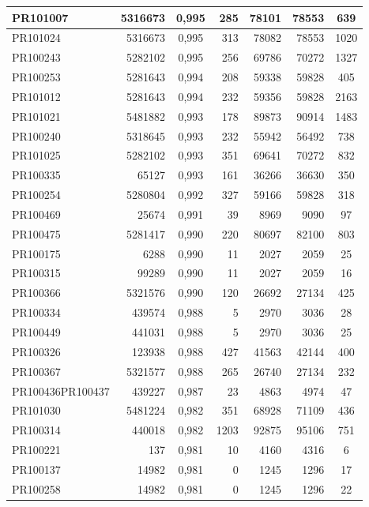 \begin{center}
\begin{longtable}{lr|c|rrr|c}
	PR101007 & 5316673 & 0,995 & 285 & 78101 & 78553 & 639 \\ \hline
	PR101024 & 5316673 & 0,995 & 313 & 78082 & 78553 & 1020 \\ \hline
	PR100243 & 5282102 & 0,995 & 256 & 69786 & 70272 & 1327 \\ \hline
	PR100253 & 5281643 & 0,994 & 208 & 59338 & 59828 & 405 \\ \hline
	PR101012 & 5281643 & 0,994 & 232 & 59356 & 59828 & 2163 \\ \hline
	PR101021 & 5481882 & 0,993 & 178 & 89873 & 90914 & 1483 \\ \hline
	PR100240 & 5318645 & 0,993 & 232 & 55942 & 56492 & 738 \\ \hline
	PR101025 & 5282102 & 0,993 & 351 & 69641 & 70272 & 832 \\ \hline
	PR100335 & 65127 & 0,993 & 161 & 36266 & 36630 & 350 \\ \hline
	PR100254 & 5280804 & 0,992 & 327 & 59166 & 59828 & 318 \\ \hline
	PR100469 & 25674 & 0,991 & 39 & 8969 & 9090 & 97 \\ \hline
	PR100475 & 5281417 & 0,990 & 220 & 80697 & 82100 & 803 \\ \hline
	PR100175 & 6288 & 0,990 & 11 & 2027 & 2059 & 25 \\ \hline
	PR100315 & 99289 & 0,990 & 11 & 2027 & 2059 & 16 \\ \hline
	PR100366 & 5321576 & 0,990 & 120 & 26692 & 27134 & 425 \\ \hline
	PR100334 & 439574 & 0,988 & 5 & 2970 & 3036 & 28 \\ \hline
	PR100449 & 441031 & 0,988 & 5 & 2970 & 3036 & 25 \\ \hline
	PR100326 & 123938 & 0,988 & 427 & 41563 & 42144 & 400 \\ \hline
	PR100367 & 5321577 & 0,988 & 265 & 26740 & 27134 & 232 \\ \hline
	PR100436PR100437 & 439227 & 0,987 & 23 & 4863 & 4974 & 47 \\ \hline
	PR101030 & 5481224 & 0,982 & 351 & 68928 & 71109 & 436 \\ \hline
	PR100314 & 440018 & 0,982 & 1203 & 92875 & 95106 & 751 \\ \hline
	PR100221 & 137 & 0,981 & 10 & 4160 & 4316 & 6 \\ \hline
	PR100137 & 14982 & 0,981 & 0 & 1245 & 1296 & 17 \\ \hline
	PR100258 & 14982 & 0,981 & 0 & 1245 & 1296 & 22 \\ \hline

\end{longtable}
\end{center}
